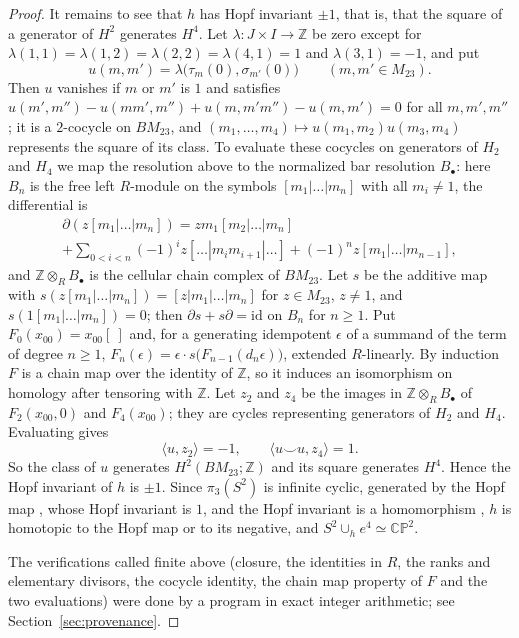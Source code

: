\documentclass[11pt,a4paper]{article}
\theoremstyle{definition}
\newcommand{\Z}{\mathbb{Z}}
\newcommand{\CP}{\mathbb{CP}}
\newcommand{\id}{\mathrm{id}}
\begin{document}
\begin{proof}
It remains to see that $h$ has Hopf invariant $\pm1$, that is, that the
square of a generator of $H^2$ generates $H^4$. Let
$\lambda\colon J\times I\to\Z$ be zero except for
$\lambda(1,1)=\lambda(1,2)=\lambda(2,2)=\lambda(4,1)=1$ and
$\lambda(3,1)=-1$, and put
\[
 u(m,m')=\lambda\bigl(\tau_m(0),\sigma_{m'}(0)\bigr)\qquad(m,m'\in M_{23}).
\]
Then $u$ vanishes if $m$ or $m'$ is $1$ and satisfies
$u(m',m'')-u(mm',m'')+u(m,m'm'')-u(m,m')=0$ for all $m,m',m''$; it is a
$2$-cocycle on $BM_{23}$, and $(m_1,\dots,m_4)\mapsto u(m_1,m_2)u(m_3,m_4)$
represents the square of its class. To evaluate these cocycles on generators
of $H_2$ and $H_4$ we map the resolution above to the normalized bar
resolution $B_\bullet$: here $B_n$ is the free left $R$-module on the symbols
$[m_1|\dots|m_n]$ with all $m_i\ne1$, the differential is
\begin{multline*}
 \partial(z[m_1|\dots|m_n])=zm_1[m_2|\dots|m_n]\\
 +\sum_{0<i<n}(-1)^iz[\dots|m_im_{i+1}|\dots]+(-1)^nz[m_1|\dots|m_{n-1}],
\end{multline*}
and $\Z\otimes_RB_\bullet$ is the cellular chain complex of $BM_{23}$. Let
$s$ be the additive map with $s(z[m_1|\dots|m_n])=[z|m_1|\dots|m_n]$ for
$z\in M_{23}$, $z\neq1$, and $s(1[m_1|\dots|m_n])=0$; then
$\partial s+s\partial=\id$ on $B_n$ for $n\ge1$. Put $F_0(x_{00})=x_{00}[\ ]$
and, for a generating idempotent $\epsilon$ of a summand of the term of
degree $n\ge1$, $F_n(\epsilon)=\epsilon\cdot s\bigl(F_{n-1}(d_n\epsilon)
\bigr)$, extended $R$-linearly. By induction $F$ is a chain map over the
identity of $\Z$, so it induces an isomorphism on homology after tensoring
with $\Z$. Let $z_2$ and $z_4$ be the images in $\Z\otimes_RB_\bullet$ of
$F_2(x_{00},0)$ and $F_4(x_{00})$; they are cycles representing generators
of $H_2$ and $H_4$. Evaluating gives
\[
 \langle u,z_2\rangle=-1,\qquad
 \langle u\smile u,z_4\rangle=1 .
\]
So the class of $u$ generates $H^2(BM_{23};\Z)$ and its square generates
$H^4$. Hence the Hopf invariant of $h$ is $\pm1$. Since
$\pi_3(S^2)$ is infinite cyclic, generated by the Hopf map
\cite[Example~4.51]{Ha}, whose Hopf invariant is $1$, and the Hopf invariant
is a homomorphism \cite[\S4.B, Proposition~4B.1]{Ha},
$h$ is homotopic to the Hopf map or to its negative, and
$S^2\cup_he^4\simeq\CP^2$.

The verifications called finite above (closure, the identities in $R$, the
ranks and elementary divisors, the cocycle identity, the chain map property
of $F$ and the two evaluations) were done by a program in exact integer
arithmetic; see Section~\ref{sec:provenance}.
\end{proof}
\end{document}
